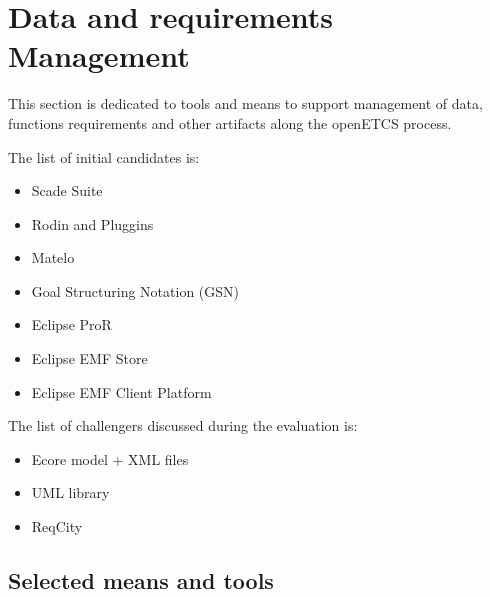 

\chapter{Data and requirements Management}
\label{sec:management}

 
This section is dedicated to tools and means to support management of data, functions requirements and other artifacts along  the openETCS process.


The list of initial candidates is:

\begin{itemize}
\item Scade Suite
\item Rodin and Pluggins
\item Matelo
\item Goal Structuring Notation (GSN)
\item Eclipse ProR
\item Eclipse EMF Store
\item Eclipse EMF Client Platform
\end{itemize}


The list of challengers discussed during the evaluation is:

\begin{itemize}
\item Ecore model + XML  files
\item UML library
\item ReqCity
\end{itemize}

\section{Selected means and tools}

\begin{comment}
To complete after decision meeting with a section for each tool with the following contents:

\begin{itemize}
\item description of the means or tools, references and links
\item added value for openETCS
\item for which tasks and how (input/output/actions) is the mean or tools used.
\end{itemize}
\end{comment}